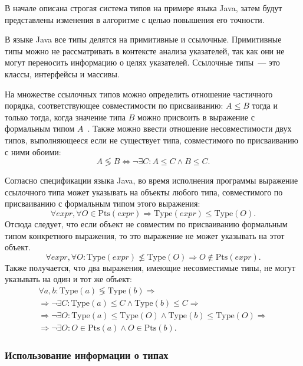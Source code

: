 \documentclass[14pt,titlepage]{extarticle}
\newcommand{\Type}[1]{\textrm{Type}(#1)}
\newcommand{\Pts}[1]{\textrm{Pts}(#1)}
\renewcommand{\leq}{\leqslant}
\begin{document}
      В начале описана строгая система типов на примере языка Java, затем будут
      представлены изменения в алгоритме с целью повышения его точности.

      В языке Java все типы делятся на примитивные и ссылочные.
      Примитивные типы можно не рассматривать в контексте анализа указателей,
      так как они не могут переносить информацию о целях указателей.
      Ссылочные типы~--- это классы, интерфейсы и массивы.

      На множестве ссылочных типов можно определить отношение частичного
      порядка, соответствующее совместимости по присваиванию:
      $A \leq B$ тогда и только тогда, когда значение типа $B$ можно присвоить
      в выражение с формальным типом $A$~\cite{nastia_type_analysis}.
      Также можно ввести отношение несовместимости двух типов, выполняющееся
      если не существует типа, совместимого по присваиванию с ними обоими:
      \[ A \lessgtr B
         \Leftrightarrow
         \lnot \exists C\colon A \leq C \land B \leq C. \]

      Согласно спецификации языка Java, во время исполнения программы выражение
      ссылочного типа может указывать на объекты любого типа, совместимого по
      присваиванию с формальным типом этого выражения:
      \[ \forall expr, \forall O \in \Pts{expr}
         \Rightarrow
         \Type{expr} \leq \Type{O}. \]
      Отсюда следует, что если объект не совместим по присваиванию
      формальным типом конкретного выражения, то это выражение не может
      указывать на этот объект.
      \[ \forall expr, \forall O\colon \Type{expr} \not\leq \Type{O}
         \Rightarrow
         O \not\in \Pts{expr}. \]
      Также получается, что два выражения, имеющие несовместимые типы, не могут
      указывать на один и тот же объект:
      \begin{gather*}
        \forall a, b\colon \Type{a} \lessgtr \Type{b}
        \Rightarrow \\ \Rightarrow
        \lnot \exists C\colon \Type{a} \leq C \land \Type{b} \leq C
        \Rightarrow \\ \Rightarrow
        \lnot \exists O\colon \Type{a} \leq \Type{O}
                        \land \Type{b} \leq \Type{O}
        \Rightarrow \\ \Rightarrow
        \lnot \exists O\colon O \in \Pts{a}
                        \land O \in \Pts{b}.
      \end{gather*}

      \subsubsection{Использование информации о типах}
\end{document}
